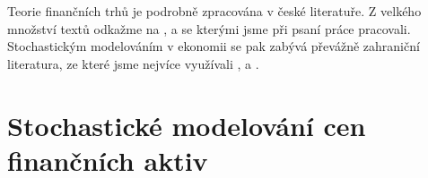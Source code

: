 \documentclass[a4paper,12pt]{report}
\theoremstyle{definition} \newtheorem{definice}[veta]{Definice}
\theoremstyle{remark}
\begin{document}

Teorie finančních trhů je podrobně zpracována v české literatuře.
Z velkého množství textů odkažme na \cite{rejnus2011}, \cite{fuchsfinancni} a \cite{veselainvestovani} se kterými jsme při psaní práce pracovali.
Stochastickým modelováním v ekonomii se pak zabývá převážně zahraniční literatura, ze které jsme nejvíce využívali \cite{hull}, \cite{wilmott1995mathematics} a \cite{karatzas1998methods}.

\section{Stochastické modelování cen finančních aktiv}\label{stoch_model_aktiv}


\end{document}

